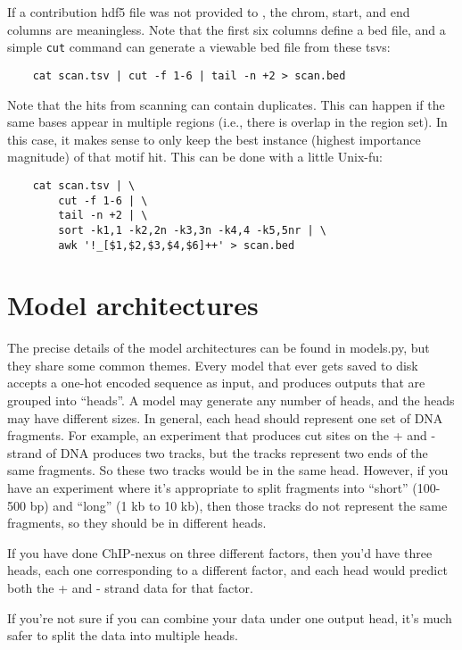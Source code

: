\documentclass{article}
\begin{document}
If a contribution hdf5 file was not provided to , the chrom, start,
and end columns are meaningless.
Note that the first six columns define a bed file, and a simple \texttt{cut}
command can generate a viewable bed file from these tsvs:

\begin{lstlisting}
    cat scan.tsv | cut -f 1-6 | tail -n +2 > scan.bed
\end{lstlisting}

Note that the hits from scanning can contain duplicates. This can happen if the same bases
appear in multiple regions (i.e., there is overlap in the region set). In this case, it makes
sense to only keep the best instance (highest importance magnitude) of that motif hit.
This can be done with a little Unix-fu:

\begin{lstlisting}
    cat scan.tsv | \
        cut -f 1-6 | \
        tail -n +2 | \
        sort -k1,1 -k2,2n -k3,3n -k4,4 -k5,5nr | \
        awk '!_[$1,$2,$3,$4,$6]++' > scan.bed
\end{lstlisting}
\newpage
\section{Model architectures}\label{sec:modelArchitectures}

The precise details of the model architectures can be found in models.py, but they share some
common themes.
Every model that ever gets saved to disk accepts a one-hot encoded sequence as input, and produces
outputs that are grouped into ``heads''.
A model may generate any number of heads, and the heads may have different sizes.
In general, each head should represent one set of DNA fragments. For example, an experiment that
produces cut sites on the + and - strand of DNA produces two tracks, but the tracks represent two
ends of the same fragments. So these two tracks would be in the same head.
However, if you have an experiment where it's appropriate to split fragments into ``short''
(100-500 bp) and ``long'' (1 kb to 10 kb), then those tracks do not represent the same
fragments, so they should be in different heads.

If you have done ChIP-nexus on three different factors, then you'd have three heads, each one
corresponding to a different factor, and each head would predict both the + and - strand data
for that factor.

If you're not sure if you can combine your data under one output head, it's much safer to split
the data into multiple heads.
\end{document}
